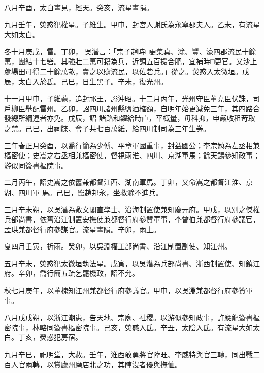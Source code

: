 \begin{pinyinscope}
 八月辛酉，太白晝見，經天。癸亥，流星晝隕。



 九月壬午，熒惑犯權星。子維生。甲申，封宮人謝氏為永寧郡夫人。乙未，有流星大如太白。



 冬十月庚戌，雷。丁卯，
 吳潛言：「宗子趙時□更集真、滁、豐、濠四郡流民十餘萬，團結十七砦。其強壯二萬可籍為兵，近調五百援合肥，宜補時□更官。又沙上蘆場田可得二十餘萬畝，賣之以贍流民，以佐砦兵。」從之。熒惑入太微垣。戊辰，太白入於氐。己巳，日生黑子。辛未，復光州。



 十一月甲申，子維薨，追封祁王，謚沖昭。十二月丙午，光州守臣董堯臣伏誅，司戶柳臣舉配雷州。乙卯，詔四川諸州縣鹽酒榷額，自明年始更減免三年，其四路合發總所綱運者亦免。戊辰，詔
 諸路和糴給時直，平概量，毋科抑，申嚴收租苛取之禁。己巳，出祠牒、會子共七百萬紙，給四川制司為三年生券。



 三年春正月癸酉，以喬行簡為少傅、平章軍國重事，封益國公；李宗勉為左丞相兼樞密使；史嵩之右丞相兼樞密使，督視兩淮、四川、京湖軍馬；餘天錫參知政事；游似同簽書樞院事。



 二月丙午，詔史嵩之依舊兼都督江西、湖南軍馬。丁卯，又命嵩之都督江淮、京湖、四川軍
 馬。己巳，竄趙邦永，坐救滁不進兵。



 三月辛未朔，以吳潛為敷文閣直學士、沿海制置使兼知慶元府。甲戌，以別之傑權兵部尚書，依舊沿江制置安撫使兼都督行府參贊軍事，李曾伯兼都督行府參議官，孟珙兼都督行府參謀官。流星晝隕。辛卯，雨土。



 夏四月壬寅，祈雨。癸卯，以吳淵權工部尚書、沿江制置副使、知江州。



 五月辛未，熒惑犯太微垣執法星。戊寅，以吳潛為兵部尚書、浙西制置使、知鎮江府。辛卯，喬行簡五疏乞罷機政，詔不允。



 秋七月庚午，以董槐知江州兼都督行府參議官。甲申，以吳淵兼都督行府參贊軍事。



 八月戊戌朔，以浙江潮患，告天地、宗廟、社稷。以游似參知政事，許應龍簽書樞密院事，林略同簽書樞密院事。己亥，熒惑入氐。辛丑，太陰入氐。有流星大如太白。丁亥，熒惑犯房宿。



 九月辛巳，祀明堂，大赦。壬午，淮西敢勇將官陸旺、李威特與官三轉，同出戰二百人官兩轉，以賞廬州磨店北之功，其陣沒者優與撫恤。




\end{pinyinscope}
